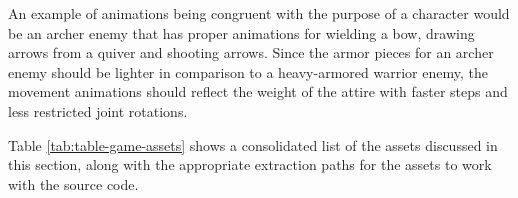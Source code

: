 \documentclass[cic,tc,english]{iiufrgs}
\begin{document}
An example of animations being congruent with the purpose of a character would be an archer enemy that has proper animations for wielding a bow, drawing arrows from a quiver and shooting arrows. Since the armor pieces for an archer enemy should be lighter in comparison to a heavy-armored warrior enemy, the movement animations should reflect the weight of the attire with faster steps and less restricted joint rotations.




Table \ref{tab:table-game-assets} shows a consolidated list of the assets discussed in this section, along with the appropriate extraction paths for the assets to work with the source code.
\end{document}
